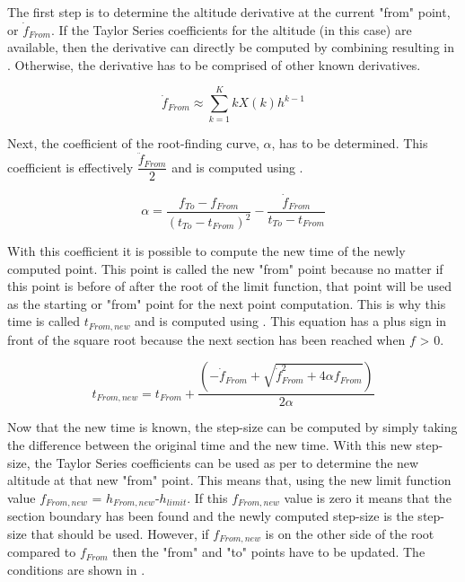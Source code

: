 \noindent
The first step is to determine the altitude derivative at the current "from" point, or $\dot{f}_{From}$. If the Taylor Series coefficients for the altitude (in this case) are available, then the derivative can directly be computed by combining  resulting in . Otherwise, the derivative has to be comprised of other known derivatives.

\begin{equation}\label{eq:fFromDot}
\dot{f}_{From} \approx \displaystyle\sum_{k=1}^{K}kX\left(k\right) h^{k-1}
\end{equation}

\noindent
Next, the coefficient of the root-finding curve, $\alpha$, has to be determined. This coefficient is effectively $\dfrac{\ddot{f}_{From}}{2}$ and is computed using .

\begin{equation} \label{eq:alphaForRoot}
\alpha = \dfrac{f_{To}-f_{From}}{\left(t_{To}-t_{From}\right)^{2}}-\dfrac{\dot{f}_{From}}{t_{To}-t_{From}}
\end{equation}


\noindent
With this coefficient it is possible to compute the new time of the newly computed point. This point is called the new "from" point because no matter if this point is before of after the root of the limit function, that point will be used as the starting or "from" point for the next point computation. This is why this time is called $t_{From,new}$ and is computed using . This equation has a plus sign in front of the square root because the next section has been reached when $f$ > 0.

\begin{equation} \label{eq:tFromNew}
t_{From,new} = t_{From}+\dfrac{\left(-\dot{f}_{From}+\sqrt{\dot{f}_{From}^{2}+4\alpha f_{From}}\right)}{2\alpha}
\end{equation}

\noindent
Now that the new time is known, the step-size can be computed by simply taking the difference between the original time and the new time. With this new step-size, the Taylor Series coefficients can be used as per  to determine the new altitude at that new "from" point. This means that, using  the new limit function value $f_{From,new}$ = $h_{From,new}$-$h_{limit}$. If this $f_{From,new}$ value is zero it means that the section boundary has been found and the newly computed step-size is the step-size that should be used. However, if $f_{From,new}$ is on the other side of the root compared to $f_{From}$ then the "from" and "to" points have to be updated. The conditions are shown in .

